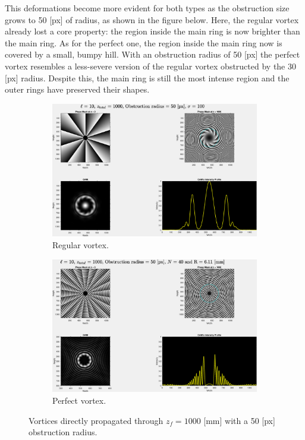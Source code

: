 This deformations become more evident for both types as the obstruction size grows to 50 [px] of radius, as shown in the figure below. Here, the regular vortex already lost a core property: the region inside the main ring is now brighter than the main ring. As for the perfect one, the region inside the main ring now is covered by a small, bumpy hill. With an obstruction radius of 50 [px] the perfect vortex resembles a less-severe version of the regular vortex obstructed by the 30 [px] radius. Despite this, the main ring is still the most intense region and the outer rings have preserved their shapes.

\begin{figure}[htbp]
    \centering
    \begin{subfigure}[b]{0.45\textwidth}
        \centering
        \includegraphics[width=\textwidth]{images/c04/type=0_r=50_zi=0_zf=1000.eps}
        \caption{Regular vortex.}
    \end{subfigure}
    \hfill
    \begin{subfigure}[b]{0.45\textwidth}
        \centering
        \includegraphics[width=\textwidth]{images/c04/type=1_r=50_zi=0_zf=1000.eps}
        \caption{Perfect vortex.}
    \end{subfigure}
    \caption{Vortices directly propagated through $z_f = 1000$ [mm] with a 50 [px] obstruction radius.}
    \label{fig:Vortices_r=50_z=1000}
\end{figure}


